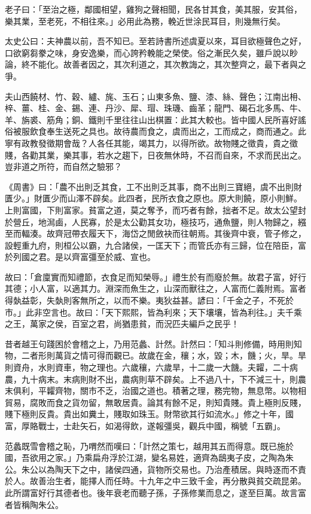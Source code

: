 
\begin{pinyinscope}
老子曰：「至治之極，鄰國相望，雞狗之聲相聞，民各甘其食，美其服，安其俗，樂其業，至老死，不相往來。」必用此為務，輓近世涂民耳目，則幾無行矣。

太史公曰：夫神農以前，吾不知已。至若詩書所述虞夏以來，耳目欲極聲色之好，口欲窮芻豢之味，身安逸樂，而心誇矜輓能之榮使。俗之漸民久矣，雖戶說以眇論，終不能化。故善者因之，其次利道之，其次教誨之，其次整齊之，最下者與之爭。

夫山西饒材、竹、穀、纑、旄、玉石；山東多魚、鹽、漆、絲、聲色；江南出枏、梓、薑、桂、金、錫、連、丹沙、犀、瑁、珠璣、齒革；龍門、碣石北多馬、牛、羊、旃裘、筋角；銅、鐵則千里往往山出棋置：此其大較也。皆中國人民所喜好謠俗被服飲食奉生送死之具也。故待農而食之，虞而出之，工而成之，商而通之。此寧有政教發徵期會哉？人各任其能，竭其力，以得所欲。故物賤之徵貴，貴之徵賤，各勸其業，樂其事，若水之趨下，日夜無休時，不召而自來，不求而民出之。豈非道之所符，而自然之驗邪？

《周書》曰：「農不出則乏其食，工不出則乏其事，商不出則三寶絕，虞不出則財匱少。」財匱少而山澤不辟矣。此四者，民所衣食之原也。原大則饒，原小則鮮。上則富國，下則富家。貧富之道，莫之奪予，而巧者有餘，拙者不足。故太公望封於營丘，地澙鹵，人民寡，於是太公勸其女功，極技巧，通魚鹽，則人物歸之，繦至而輻湊。故齊冠帶衣履天下，海岱之閒斂袂而往朝焉。其後齊中衰，管子修之，設輕重九府，則桓公以霸，九合諸侯，一匡天下；而管氏亦有三歸，位在陪臣，富於列國之君。是以齊富彊至於威、宣也。

故曰：「倉廩實而知禮節，衣食足而知榮辱。」禮生於有而廢於無。故君子富，好行其德；小人富，以適其力。淵深而魚生之，山深而獸往之，人富而仁義附焉。富者得埶益彰，失埶則客無所之，以而不樂。夷狄益甚。諺曰：「千金之子，不死於市。」此非空言也。故曰：「天下熙熙，皆為利來；天下壤壤，皆為利往。」夫千乘之王，萬家之侯，百室之君，尚猶患貧，而況匹夫編戶之民乎！

昔者越王句踐困於會稽之上，乃用范蠡、計然。計然曰：「知斗則修備，時用則知物，二者形則萬貨之情可得而觀已。故歲在金，穰；水，毀；木，饑；火，旱。旱則資舟，水則資車，物之理也。六歲穰，六歲旱，十二歲一大饑。夫糶，二十病農，九十病末。末病則財不出，農病則草不辟矣。上不過八十，下不減三十，則農末俱利，平糶齊物，關市不乏，治國之道也。積著之理，務完物，無息幣。以物相貿易，腐敗而食之貨勿留，無敢居貴。論其有餘不足，則知貴賤。貴上極則反賤，賤下極則反貴。貴出如糞土，賤取如珠玉。財幣欲其行如流水。」修之十年，國富，厚賂戰士，士赴矢石，如渴得飲，遂報彊吳，觀兵中國，稱號「五霸」。

范蠡既雪會稽之恥，乃喟然而嘆曰：「計然之策七，越用其五而得意。既已施於國，吾欲用之家。」乃乘扁舟浮於江湖，變名易姓，適齊為鴟夷子皮，之陶為朱公。朱公以為陶天下之中，諸侯四通，貨物所交易也。乃治產積居。與時逐而不責於人。故善治生者，能擇人而任時。十九年之中三致千金，再分散與貧交疏昆弟。此所謂富好行其德者也。後年衰老而聽子孫，子孫修業而息之，遂至巨萬。故言富者皆稱陶朱公。


\end{pinyinscope}
